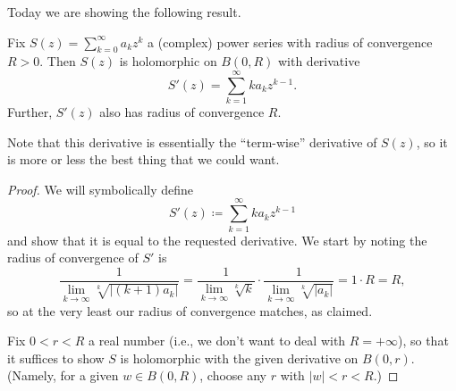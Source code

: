 Today we are showing the following result.
\begin{proposition} \label{prop:powerseriesholo}
	Fix $S(z)=\sum_{k=0}^\infty a_kz^k$ a (complex) power series with radius of convergence $R>0$. Then $S(z)$ is holomorphic on $B(0,R)$ with derivative
	\[S'(z)=\sum_{k=1}^\infty ka_kz^{k-1}.\]
	Further, $S'(z)$ also has radius of convergence $R$.
\end{proposition}
Note that this derivative is essentially the ``term-wise'' derivative of $S(z)$, so it is more or less the best thing that we could want.
\begin{proof}
	We will symbolically define
	\[S'(z)\coloneqq \sum_{k=1}^\infty ka_kz^{k-1}\]
	and show that it is equal to the requested derivative. We start by noting the radius of convergence of $S'$ is
	\[\frac1{\lim_{k\to\infty}\sqrt[k]{|(k+1)a_k|}}=\frac1{\lim_{k\to\infty}\sqrt[k]k}\cdot\frac1{\lim_{k\to\infty}\sqrt[k]{|a_k|}}=1\cdot R=R,\]
	so at the very least our radius of convergence matches, as claimed.
	
	Fix $0<r<R$ a real number (i.e., we don't want to deal with $R=+\infty$), so that it suffices to show $S$ is holomorphic with the given derivative on $B(0,r)$. (Namely, for a given $w\in B(0,R)$, choose any $r$ with $|w|<r<R$.)
	

\end{proof}
